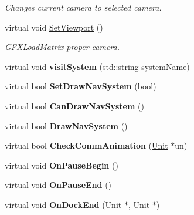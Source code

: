 \begin{DoxyCompactItemize}
\begin{DoxyCompactList}\small\item\em Changes current camera to selected camera. \end{DoxyCompactList}\item 
virtual void \hyperlink{classCockpit_ad10193e00b4455177ab6efc0b712cc57}{Set\+Viewport} ()\hypertarget{classCockpit_ad10193e00b4455177ab6efc0b712cc57}{}\label{classCockpit_ad10193e00b4455177ab6efc0b712cc57}

\begin{DoxyCompactList}\small\item\em G\+F\+X\+Load\+Matrix proper camera. \end{DoxyCompactList}\item 
virtual void {\bfseries visit\+System} (std\+::string system\+Name)\hypertarget{classCockpit_a96efa6ebd1229937d2d659cf07431122}{}\label{classCockpit_a96efa6ebd1229937d2d659cf07431122}

\item 
virtual bool {\bfseries Set\+Draw\+Nav\+System} (bool)\hypertarget{classCockpit_ab937da34a33b617152910885d8f8ea3e}{}\label{classCockpit_ab937da34a33b617152910885d8f8ea3e}

\item 
virtual bool {\bfseries Can\+Draw\+Nav\+System} ()\hypertarget{classCockpit_ac4b089e4f7a8fcb3b4c3b0d97aac2b10}{}\label{classCockpit_ac4b089e4f7a8fcb3b4c3b0d97aac2b10}

\item 
virtual bool {\bfseries Draw\+Nav\+System} ()\hypertarget{classCockpit_aded4c6c860c0b89933957d89c50a2ae2}{}\label{classCockpit_aded4c6c860c0b89933957d89c50a2ae2}

\item 
virtual bool {\bfseries Check\+Comm\+Animation} (\hyperlink{classUnit}{Unit} $\ast$un)\hypertarget{classCockpit_a4305e051971f5585595fb74f9c98f77c}{}\label{classCockpit_a4305e051971f5585595fb74f9c98f77c}

\item 
virtual void {\bfseries On\+Pause\+Begin} ()\hypertarget{classCockpit_ae248da7618a58117ba1b023096919b61}{}\label{classCockpit_ae248da7618a58117ba1b023096919b61}

\item 
virtual void {\bfseries On\+Pause\+End} ()\hypertarget{classCockpit_a9e5f4b7fb5ac4bc2771b4b4d52dd7af4}{}\label{classCockpit_a9e5f4b7fb5ac4bc2771b4b4d52dd7af4}

\item 
virtual void {\bfseries On\+Dock\+End} (\hyperlink{classUnit}{Unit} $\ast$, \hyperlink{classUnit}{Unit} $\ast$)\hypertarget{classCockpit_a37681ddfd248a92d557a0e91a99d932c}{}\label{classCockpit_a37681ddfd248a92d557a0e91a99d932c}


\end{DoxyCompactItemize}
